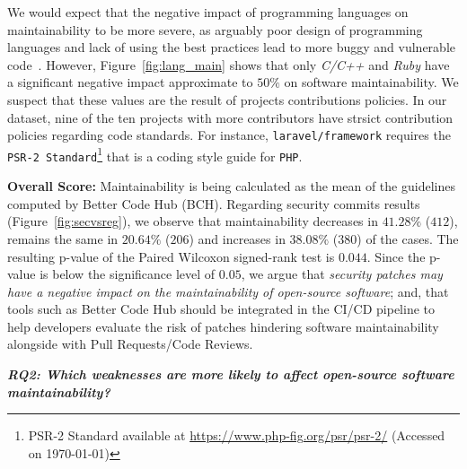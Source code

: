 \documentclass[10pt,conference]{IEEEtran}
\newcommand\Luis[1]{\nb{Luis}{mygreen}{#1}}
\begin{document}
We would expect that the negative impact of programming languages on
maintainability to be more severe, as arguably poor design of programming
languages and lack of using the best practices lead to more buggy and vulnerable
code~\cite{Ray:2017:LSP:3144574.3126905, 2019arXiv190110220B}. However,
Figure~\ref{fig:lang_main} shows that only \emph{C/C++} and \emph{Ruby} have 
a significant negative impact approximate to $50\%$ on software 
maintainability. We suspect that these values are
the result of projects contributions policies. In our dataset, 
nine of the ten projects with more contributors have strsict contribution policies regarding code
standards. For
instance, \texttt{laravel/framework} requires the \texttt{PSR-2
Standard}\footnote{PSR-2 Standard available at
\url{https://www.php-fig.org/psr/psr-2/} (Accessed on \today{})} that is a coding style guide for \texttt{PHP}.



\textbf{Overall Score:} Maintainability is being calculated as the mean of 
the guidelines computed by Better Code Hub (BCH). Regarding security 
commits results (Figure~\ref{fig:secvsreg}), we observe that
maintainability decreases in $41.28\%$ ($412$), remains the same in $20.64\%$ 
($206$) and increases in $38.08\%$ ($380$) of the cases. The resulting
p-value of the Paired Wilcoxon signed-rank test is $0.044$. Since the p-value is 
below the significance level of $0.05$, we argue that \emph{security patches 
may have a negative impact on the maintainability of open-source software}; and, 
that tools such as Better Code Hub should be integrated in the CI/CD pipeline
to help developers evaluate the risk of patches hindering software maintainability
alongside with Pull Requests/Code Reviews.
%

\textit{\textbf{RQ2: Which weaknesses are more likely to
affect open-source software maintainability?}}
\end{document}
